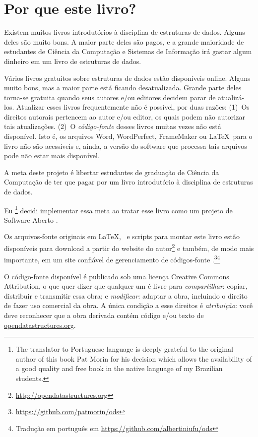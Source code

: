 \chapter*{Por que este livro?}

Existem muitos livros introdutórios à disciplina de estruturas de dados.
Alguns deles são muito bons. A maior parte deles são pagos, e a
grande maioridade de estudantes de Ciência da Computação e Sistemas de
Informação irá gastar algum dinheiro em um livro de estruturas de dados.

Vários livros gratuitos sobre estruturas de dados estão disponíveis online.
Alguns muito bons, mas a maior parte está ficando desatualizada. Grande
parte deles torna-se gratuita quando seus autores e/ou editores decidem
parar de atualizá-los. Atualizar esses livros frequentemente não é possível,
por duas razões: (1)~Os direitos autorais pertencem ao autor e/ou editor,
os quais podem não autorizar tais atualizações. (2)~O \emph{código-fonte} desses
livros muitas vezes não está disponível. Isto é, os arquivos Word, WordPerfect,
FrameMaker ou \LaTeX\ para o livro não são acessíveis e, ainda, a versão do
software que processa tais arquivos pode não estar mais disponível.

A meta deste projeto é libertar estudantes de graduação de Ciência da Computação
de ter que pagar por um livro introdutório à disciplina de estruturas de dados.

Eu
\footnote{The translator to Portuguese language is deeply grateful to the original author of this book Pat Morin for his decision which allows the availability of a good quality and free book in the
native language of my Brazilian students.} decidi implementar essa meta ao tratar esse livro como um projeto de Software Aberto
%
%
.

Os arquivos-fonte originais em \LaTeX, \lang\ e scripts para montar este livro estão disponíveis para download a partir do website do autor\footnote{\url{http://opendatastructures.org}}
e também, de modo mais importante, em um site confiável de gerenciamento de códigos-fonte
.\footnote{\url{https://github.com/patmorin/ods}}\footnote{Tradução em português em \url{https://github.com/albertiniufu/ods}}

O código-fonte disponível é publicado sob uma licença
Creative Commons Attribution,
o que quer dizer que qualquer um é livre para \emph{compartilhar}:
copiar, distribuir e
transmitir essa obra; e \emph{modificar}:
adaptar a obra, incluindo o direito
de fazer uso comercial da obra.
A única condição a esse direitos é \emph{atribuição}:
você deve reconhecer que a obra derivada contém código e/ou texto de \url{opendatastructures.org}.

